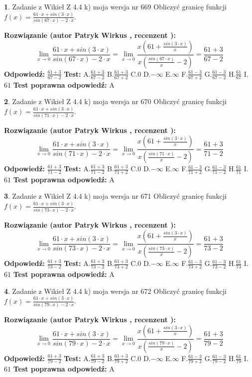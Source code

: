 \documentclass[12pt, a4paper]{article}
\theoremstyle{definition} %
\newtheorem{zad}{}
\newcommand{\zadStart}[1]{\begin{zad}#1\newline}
\newcommand{\zadStop}{\end{zad}}
\newcommand{\rozwStart}[2]{\noindent \textbf{Rozwiązanie (autor #1 , recenzent #2): }\newline}
\newcommand{\rozwStop}{\newline}
\newcommand{\odpStart}{\noindent \textbf{Odpowiedź:}\newline}
\newcommand{\odpStop}{\newline}
\newcommand{\testStart}{\noindent \textbf{Test:}\newline}
\newcommand{\testStop}{\newline}
\newcommand{\kluczStart}{\noindent \textbf{Test poprawna odpowiedź:}\newline}
\newcommand{\kluczStop}{\newline}
\begin{document}
\zadStart{Zadanie z Wikieł Z 4.4 k) moja wersja nr 669}
Obliczyć granicę funkcji $f(x)=\frac{61\cdot x +sin(3\cdot x)}{sin(67\cdot x) -2\cdot x}$.
\zadStop
\rozwStart{Patryk Wirkus}{}
$$\lim\limits_{x\to 0}\frac{61\cdot x +sin(3\cdot x)}{sin(67\cdot x) -2\cdot x}
=\lim\limits_{x\to 0}\frac{x(61+\frac{sin(3\cdot x)}{x})}{x(\frac{sin(67\cdot x)}{x}-2)}
=\frac{61+3}{67-2}$$
\rozwStop
\odpStart
$\frac{61+3}{67-2}$
\odpStop
\testStart
A.$\frac{61+3}{67-2}$
B.$\frac{61+3}{67+2}$
C.$0$
D.$-\infty$
E.$\infty$
F.$\frac{61-3}{67+2}$
G.$\frac{61-3}{67-2}$
H.$\frac{61}{67}$
I.$61$
\testStop
\kluczStart
A
\kluczStop



\zadStart{Zadanie z Wikieł Z 4.4 k) moja wersja nr 670}
Obliczyć granicę funkcji $f(x)=\frac{61\cdot x +sin(3\cdot x)}{sin(71\cdot x) -2\cdot x}$.
\zadStop
\rozwStart{Patryk Wirkus}{}
$$\lim\limits_{x\to 0}\frac{61\cdot x +sin(3\cdot x)}{sin(71\cdot x) -2\cdot x}
=\lim\limits_{x\to 0}\frac{x(61+\frac{sin(3\cdot x)}{x})}{x(\frac{sin(71\cdot x)}{x}-2)}
=\frac{61+3}{71-2}$$
\rozwStop
\odpStart
$\frac{61+3}{71-2}$
\odpStop
\testStart
A.$\frac{61+3}{71-2}$
B.$\frac{61+3}{71+2}$
C.$0$
D.$-\infty$
E.$\infty$
F.$\frac{61-3}{71+2}$
G.$\frac{61-3}{71-2}$
H.$\frac{61}{71}$
I.$61$
\testStop
\kluczStart
A
\kluczStop



\zadStart{Zadanie z Wikieł Z 4.4 k) moja wersja nr 671}
Obliczyć granicę funkcji $f(x)=\frac{61\cdot x +sin(3\cdot x)}{sin(73\cdot x) -2\cdot x}$.
\zadStop
\rozwStart{Patryk Wirkus}{}
$$\lim\limits_{x\to 0}\frac{61\cdot x +sin(3\cdot x)}{sin(73\cdot x) -2\cdot x}
=\lim\limits_{x\to 0}\frac{x(61+\frac{sin(3\cdot x)}{x})}{x(\frac{sin(73\cdot x)}{x}-2)}
=\frac{61+3}{73-2}$$
\rozwStop
\odpStart
$\frac{61+3}{73-2}$
\odpStop
\testStart
A.$\frac{61+3}{73-2}$
B.$\frac{61+3}{73+2}$
C.$0$
D.$-\infty$
E.$\infty$
F.$\frac{61-3}{73+2}$
G.$\frac{61-3}{73-2}$
H.$\frac{61}{73}$
I.$61$
\testStop
\kluczStart
A
\kluczStop



\zadStart{Zadanie z Wikieł Z 4.4 k) moja wersja nr 672}
Obliczyć granicę funkcji $f(x)=\frac{61\cdot x +sin(3\cdot x)}{sin(79\cdot x) -2\cdot x}$.
\zadStop
\rozwStart{Patryk Wirkus}{}
$$\lim\limits_{x\to 0}\frac{61\cdot x +sin(3\cdot x)}{sin(79\cdot x) -2\cdot x}
=\lim\limits_{x\to 0}\frac{x(61+\frac{sin(3\cdot x)}{x})}{x(\frac{sin(79\cdot x)}{x}-2)}
=\frac{61+3}{79-2}$$
\rozwStop
\odpStart
$\frac{61+3}{79-2}$
\odpStop
\testStart
A.$\frac{61+3}{79-2}$
B.$\frac{61+3}{79+2}$
C.$0$
D.$-\infty$
E.$\infty$
F.$\frac{61-3}{79+2}$
G.$\frac{61-3}{79-2}$
H.$\frac{61}{79}$
I.$61$
\testStop
\kluczStart
A
\kluczStop
\end{document}
